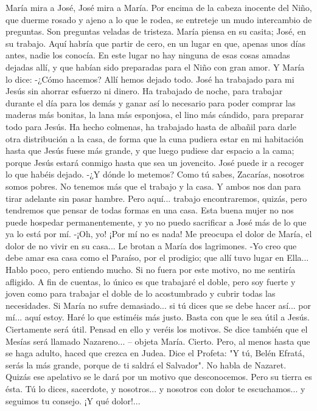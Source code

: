 \documentclass[12pt]{book} %
\begin{document}
María mira a José, José mira a María. Por encima de la cabeza inocente del Niño, que duerme rosado y ajeno a lo que le 
rodea, se entreteje un mudo intercambio de preguntas. Son preguntas veladas de tristeza. María piensa en su casita; José, en su trabajo. Aquí habría que partir de cero, en un lugar en que, apenas unos días antes, nadie los conocía. En este lugar no hay ninguna de esas cosas amadas dejadas allí, y que habían sido preparadas para el Niño con gran amor. 
Y María lo dice: 
-¿Cómo hacemos? Allí hemos dejado todo. José ha trabajado para mi Jesús sin ahorrar esfuerzo ni dinero. Ha trabajado 
de noche, para trabajar durante el día para los demás y ganar así lo necesario para poder comprar las maderas más bonitas, la lana más esponjosa, el lino más cándido, para preparar todo para Jesús. Ha hecho colmenas, ha trabajado hasta de albañil para darle otra distribución a la casa, de forma que la cuna pudiera estar en mi habitación hasta que Jesús fuese más grande, y que luego pudiese dar espacio a la cama; porque Jesús estará conmigo hasta que sea un jovencito. 
José puede ir a recoger lo que habéis dejado. 
-¿Y dónde lo metemos? Como tú sabes, Zacarías, nosotros somos pobres. No tenemos más que el trabajo y la casa. Y ambos nos dan para tirar adelante sin pasar hambre. Pero aquí... trabajo encontraremos, quizás, pero tendremos que pensar de todas formas en una casa. Esta buena mujer no nos puede hospedar permanentemente, y yo no puedo sacrificar a José más de lo que ya lo está por mí. 
-¡Oh, yo! ¡Por mí no es nada! Me preocupa el dolor de María, el dolor de no vivir en su casa... 
Le brotan a María dos lagrimones. 
-Yo creo que debe amar esa casa como el Paraíso, por el prodigio; que allí tuvo lugar en Ella... Hablo poco, pero 
entiendo mucho. Si no fuera por este motivo, no me sentiría afligido. A fin de cuentas, lo único es que trabajaré el doble, pero soy fuerte y joven como para trabajar el doble de lo acostumbrado y cubrir todas las necesidades. Si María no sufre demasiado... 
si tú dices que se debe hacer así... por mí... aquí estoy. Haré lo que estiméis más justo. Basta con que le sea útil a Jesús. 
Ciertamente será útil. Pensad en ello y veréis los motivos. 
Se dice también que el Mesías será llamado Nazareno... – objeta María. 
Cierto. Pero, al menos hasta que se haga adulto, haced que crezca en Judea. Dice el Profeta: "Y tú, Belén Efratá, serás la más grande, porque de ti saldrá el Salvador". No habla de Nazaret. Quizás ese apelativo se le dará por un motivo que desconocemos. Pero su tierra es ésta. 
Tú lo dices, sacerdote, y nosotros... y nosotros con dolor te escuchamos... y seguimos tu consejo. ¡Y qué dolor!... 
\end{document}
